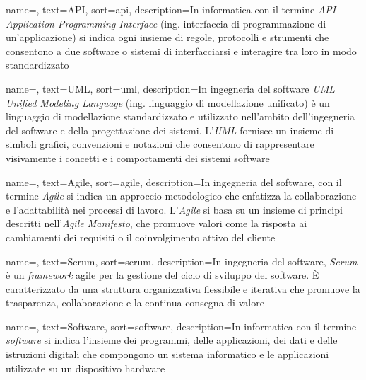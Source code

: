 

 {
    name=,
    text=API,
    sort=api,
    description={In informatica con il termine \emph{API} \emph{Application Programming Interface} (ing. interfaccia di programmazione di un'applicazione) si indica
    ogni insieme di regole, protocolli e strumenti che consentono a due software o sistemi di interfacciarsi e interagire tra loro in modo standardizzato}
}

 {
    name=,
    text=UML,
    sort=uml,
    description={In ingegneria del software \emph{UML} \emph{Unified Modeling Language} (ing. linguaggio di modellazione unificato) è un linguaggio di 
    modellazione standardizzato e utilizzato nell'ambito dell'ingegneria del software e della progettazione dei sistemi. L'\emph{UML} fornisce un insieme di simboli grafici, convenzioni e notazioni che consentono di rappresentare
    visivamente i concetti e i comportamenti dei sistemi software}
}

 {
    name=,
    text=Agile,
    sort=agile,
    description={In ingegneria del software, con il termine \emph{Agile} si indica un approccio metodologico che enfatizza la collaborazione e l'adattabilità nei processi di lavoro.
    L'\emph{Agile} si basa su un insieme di principi descritti nell'\emph{Agile Manifesto}, che promuove valori come la risposta ai cambiamenti dei requisiti o il coinvolgimento attivo del cliente}
}

 {
    name=,
    text=Scrum,
    sort=scrum,
    description={In ingegneria del software, \emph{Scrum} è un \emph{framework} agile per la gestione del ciclo di sviluppo del software.  È caratterizzato da una struttura organizzativa flessibile e iterativa che promuove la trasparenza, collaborazione e la continua consegna di valore}
}

 {
    name=,
    text=Software,
    sort=software,
    description={In informatica con il termine \emph{software} si indica l'insieme dei programmi, delle applicazioni, dei dati e delle istruzioni digitali che compongono un sistema informatico e le applicazioni utilizzate su un dispositivo hardware}
}

